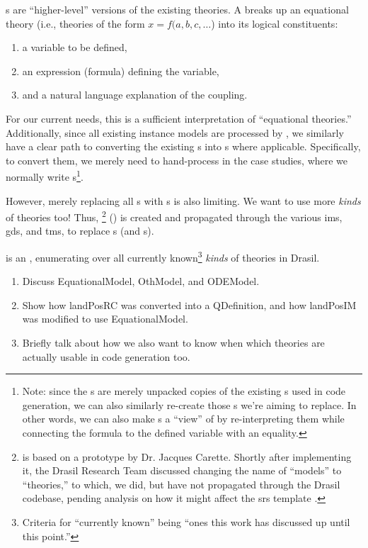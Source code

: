 \originalQDefinitionHaskell{}

\QDefinition{}s are ``higher-level'' versions of the existing theories. A
\QDefinition{} breaks up an equational theory (i.e., theories of the form \(x =
f(a, b, c, \ldots{}\)) into its logical constituents:
\begin{enumerate}
    \item a variable to be defined,
    \item an expression (formula) defining the variable,
    \item and a natural language explanation of the coupling.
\end{enumerate}

For our current needs, this is a sufficient interpretation of ``equational
theories.'' Additionally, since all existing instance models are processed by
\relToQD{}, we similarly have a clear path to converting the existing
\RelationConcept{}s into \QDefinition{}s where applicable. Specifically, to
convert them, we merely need to hand-process \relToQD{} in the case studies,
where we normally write \RelationConcept{}s\footnote{Note: since the
\QDefinition{}s are merely unpacked copies of the existing \RelationConcept{}s
used in code generation, we can also similarly re-create those
\RelationConcept{}s we're aiming to replace. In other words, we can also make
\RelationConcept{}s a ``view'' of \QDefinition{} by re-interpreting them while
connecting the formula to the defined variable with an equality.}.

However, merely replacing all \RelationConcept{}s with \QDefinition{}s is also
limiting. We want to use more \textit{kinds} of theories too! Thus,
\ModelKinds{} \footnote{\ModelKinds{} is based on a prototype by Dr. Jacques
Carette. Shortly after implementing it, the Drasil Research Team discussed
changing the name of ``models'' to ``theories,'' to which, we did, but have not
propagated through the Drasil codebase, pending analysis on how it might affect
the \acs{srs} template \cite{DrasilIssue2599RenamingModels}.} () is created
and propagated through the various \acsp{im}, \acsp{gd}, and \acsp{tm}, to
replace \RelationConcept{}s (and \Relation{}s).

\originalNewModelKindsHaskell{}

\ModelKinds{} is an , enumerating over all currently
known\footnote{Criteria for ``currently known'' being ``ones this work has
discussed up until this point.''} \textit{kinds} of theories in Drasil.


\begin{enumerate}
    \item Discuss EquationalModel, OthModel, and ODEModel.
    \item Show how landPosRC was converted into a QDefinition, and how landPosIM
    was modified to use EquationalModel.
    \item Briefly talk about how we also want to know when which theories are
    actually usable in code generation too.
\end{enumerate}
